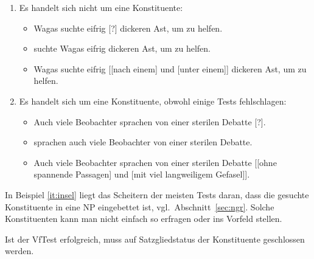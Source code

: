 \begin{enumerate}
  \item Es handelt sich nicht um eine Konstituente:
    \begin{itemize}\Lf
      \item \ProTest \Ast Wagas suchte eifrig [?] dickeren Ast, um zu helfen.
      \item \VfTest {} suchte Wagas eifrig dickeren Ast, um zu helfen.
      \item \KoorTest \Ast Wagas suchte eifrig [[nach einem] und [unter einem]] dickeren Ast, um zu helfen.
    \end{itemize}
  \item\label{it:insel} Es handelt sich um eine Konstituente, obwohl einige Tests fehlschlagen:
    \begin{itemize}\Lf
      \item \ProTest \Ast Auch viele Beobachter sprachen von einer sterilen Debatte [?].
      \item \VfTest {} sprachen auch viele Beobachter von einer sterilen Debatte.
      \item \KoorTest Auch viele Beobachter sprachen von einer sterilen Debatte [[ohne spannende Passagen] und [mit viel langweiligem Gefasel]].
    \end{itemize}
\end{enumerate}

In Beispiel \ref{it:insel} liegt das Scheitern der meisten Tests daran, dass die gesuchte Konstituente in eine NP eingebettet ist, vgl.\ Abschnitt~\ref{sec:ngr}.
Solche Konstituenten kann man nicht einfach so erfragen oder ins Vorfeld stellen.


Ist der VfTest erfolgreich, muss auf Satzgliedstatus der Konstituente geschlossen werden.

